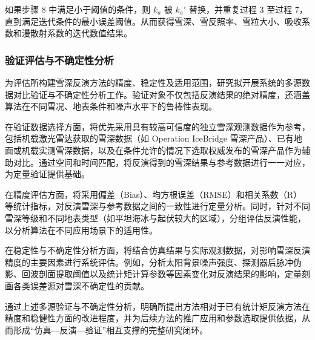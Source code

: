 如果步骤 8 中满足小于阈值的条件，则 $k_a$ 被 $k_a'$ 替换，并重复过程 3 至过程 7，直到满足迭代条件的最小误差阈值。从而获得雪深、雪反照率、雪粒大小、吸收系数和漫散射系数的迭代数值结果。

\subsubsection{验证评估与不确定性分析}

为评估所构建雪深反演方法的精度、稳定性及适用范围，研究拟开展系统的多源数据对比验证与不确定性分析工作。验证对象不仅包括反演结果的绝对精度，还涵盖算法在不同雪况、地表条件和噪声水平下的鲁棒性表现。

在验证数据选择方面，将优先采用具有较高可信度的独立雪深观测数据作为参考，包括机载激光雷达获取的雪深数据（如 Operation IceBridge 雪深产品）、已有地面或机载实测雪深数据，以及在条件允许的情况下选取权威发布的雪深产品作为辅助对比。通过空间和时间匹配，将反演得到的雪深结果与参考数据进行一一对应，为定量验证提供基础。

在精度评估方面，将采用偏差（Bias）、均方根误差（RMSE）和相关系数（R）等统计指标，对反演雪深与参考数据之间的一致性进行定量分析。同时，针对不同雪深等级和不同地表类型（如平坦海冰与起伏较大的区域），分组评估反演性能，以分析算法在不同应用场景下的适用性。

在稳定性与不确定性分析方面，将结合仿真结果与实际观测数据，对影响雪深反演精度的主要因素进行系统评估。例如，分析太阳背景噪声强度、探测器后脉冲伪影、回波剖面提取阈值以及统计矩计算参数等因素变化对反演结果的影响，定量刻画各类误差源对雪深不确定性的贡献。

通过上述多源验证与不确定性分析，明确所提出方法相对于已有统计矩反演方法在精度和稳健性方面的改进程度，并为后续方法的推广应用和参数选取提供依据，从而形成“仿真—反演—验证”相互支撑的完整研究闭环。



